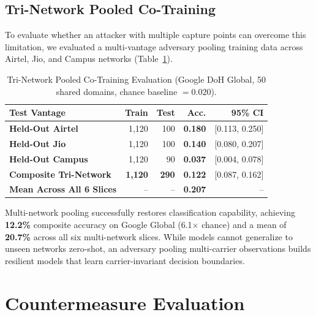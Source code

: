 \documentclass[conference,10pt]{IEEEtran}
\begin{document}
\subsection{Tri-Network Pooled Co-Training}
To evaluate whether an attacker with multiple capture points can overcome this limitation, we evaluated a multi-vantage adversary pooling training data across Airtel, Jio, and Campus networks (Table~\ref{tab:tri_network_pooled}).

\begin{table}[t]
\centering
\caption{Tri-Network Pooled Co-Training Evaluation (Google DoH Global, 50 shared domains, chance baseline $= 0.020$).}
\label{tab:tri_network_pooled}
\footnotesize
\setlength{\tabcolsep}{2.5pt}
\begin{tabular}{lrrrr}
\toprule
\textbf{Test Vantage}            & \textbf{Train}      & \textbf{Test}      & \textbf{Acc.}     & \textbf{95\% CI} \\
\midrule
\textbf{Held-Out Airtel}         & 1,120               & 100                & \textbf{0.180}    & [0.113, 0.250] \\
\textbf{Held-Out Jio}            & 1,120               & 100                & \textbf{0.140}    & [0.080, 0.207] \\
\textbf{Held-Out Campus}         & 1,120               & 90                 & \textbf{0.037}    & [0.004, 0.078] \\
\midrule
\textbf{Composite Tri-Network}   & \textbf{1,120}      & \textbf{290}       & \textbf{0.122}    & [0.087, 0.162] \\
\midrule
\textbf{Mean Across All 6 Slices}& --                  & --                 & \textbf{0.207}    & -- \\
\bottomrule
\end{tabular}
\end{table}

Multi-network pooling successfully restores classification capability, achieving \textbf{12.2\%} composite accuracy on Google Global (6.1$\times$ chance) and a mean of \textbf{20.7\%} across all six multi-network slices. While models cannot generalize to unseen networks zero-shot, an adversary pooling multi-carrier observations builds resilient models that learn carrier-invariant decision boundaries.

\section{Countermeasure Evaluation}
\label{sec:defenses}
\end{document}
